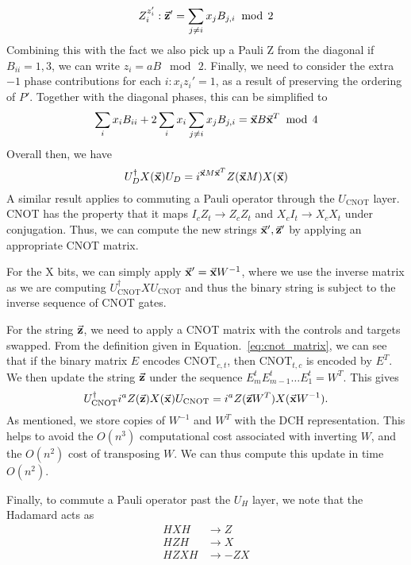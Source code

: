 \[Z_{i}^{z'_{i}}:\va{z}' = \sum_{j\neq i}x_{j}B_{j,i}\;\bmod\,2\]
Combining this with the fact we also pick up a Pauli Z from the diagonal if $B_{ii}=1,3$, we can write $z_{i}=aB\;\bmod\,2$. Finally, we need to consider the extra $-1$ phase  contributions for each $i:x_{i}z_{i}'=1$, as a result of preserving the ordering of $P'$. Together with the diagonal phases, this can be simplified to
\[
\sum_{i}x_{i}B_{ii} + 2\sum_{i}x_{i}\sum_{j\neq i}x_{j}B_{j,i} = \va{x}B\va{x}^{T}\;\bmod\, 4
\]
Overall then, we have
\begin{equation}
U_{D}^{\dagger}X(\va{x})U_{D} = i^{\va{x}M\va{x}^{T}}Z(\va{x}M)X(\va{x})
\label{eq:dch_dupdate}
\end{equation}
A similar result applies to commuting a Pauli operator through the $U_{\text{CNOT}}$ layer. CNOT has the property that it maps $I_{c}Z_{t}\rightarrow Z_{c}Z_{t}$ and $X_{c}I_{t}\rightarrow X_{c}X_{t}$ under conjugation. Thus, we can compute the new strings $\va{x}',\va{z}'$ by applying an appropriate CNOT matrix.\par
For the X bits, we can simply apply $\va{x}'=\va{x}W^{-1}$, where we use the inverse matrix as we are computing $U_{\text{CNOT}}^{\dagger} X U_{\text{CNOT}}$ and thus the binary string is subject to the inverse sequence of CNOT gates. \par
For the string $\va{z}$, we need to apply a CNOT matrix with the controls and targets swapped. From the definition given in Equation.~\ref{eq:cnot_matrix}, we can see that if the binary matrix $E$ encodes $\text{CNOT}_{c,t}$, then $\text{CNOT}_{t,c}$ is encoded by $E^{T}$. We then update the string $\va{z}$ under the sequence $E_{m}^{t}E_{m-1}^{t}\dots E_{1}^{t} = W^{T}$. This gives
\begin{equation}
U_{\text{CNOT}}^{\dagger}i^{a}Z(\va{z})X(\va{x})U_{\text{CNOT}} = i^{a}Z(\va{z}W^{T})X(\va{x}W^{-1}).
\label{eq:dch_cupdate}
\end{equation}
As mentioned, we store copies of $W^{-1}$ and $W^{T}$ with the DCH representation. This helps to avoid the $O(n^{3})$ computational cost associated with inverting $W$, and the $O(n^{2})$ cost of transposing $W$. We can thus compute this update in time $O(n^{2})$.\par
Finally, to commute a Pauli operator past the $U_{H}$ layer, we note that the Hadamard acts as
\[
\begin{array}{rcl}
HXH & \rightarrow Z\\
HZH & \rightarrow X\\
HZXH & \rightarrow -ZX
\end{array}
\]
